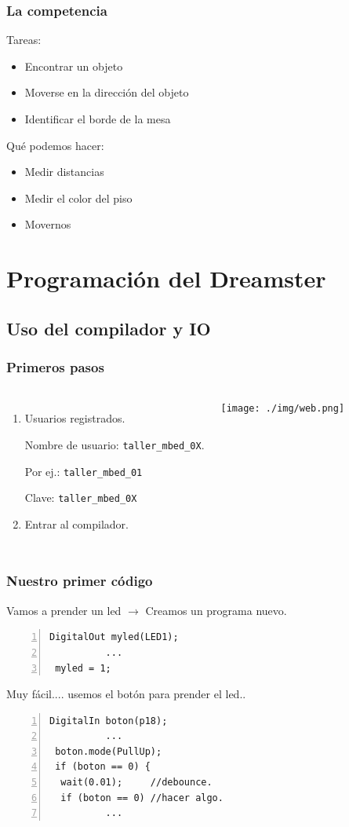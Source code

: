 \documentclass[compress]{beamer}
\begin{document}
\begin{frame}
 \frametitle{La competencia}
Tareas:
\begin{itemize}
 \item Encontrar un objeto
 \item Moverse en la dirección del objeto
 \item Identificar el borde de la mesa
\end{itemize}
Qué podemos hacer:
\begin{itemize}
 \item Medir distancias
 \item Medir el color del piso
 \item Movernos
\end{itemize}
 \end{frame}


\section{Programación del Dreamster}
\subsection{Uso del compilador y IO}

\begin{frame}[fragile]
 \frametitle{Primeros pasos}
\begin{columns}
\begin{enumerate}
 \item Usuarios registrados.

Nombre de usuario: \verb|taller_mbed_0X|.

Por ej.: \verb|taller_mbed_01|

Clave: \verb|taller_mbed_0X|
 \item Entrar al compilador.
\end{enumerate}
\begin{center}
 \texttt{[image: ./img/web.png]}
\end{center}
\end{columns}
\end{frame}

\begin{frame}[fragile]
 \frametitle{Nuestro primer código}
Vamos a prender un led $\rightarrow$ Creamos un programa nuevo.
\begin{Verbatim}[formatcom=\color{red},fontseries=b, numbers=left,numbersep=3pt]
 DigitalOut myled(LED1);
          ...
 myled = 1;
\end{Verbatim} 
Muy fácil.... usemos el botón para prender el led..
\begin{Verbatim}[formatcom=\color{red},fontseries=b, numbers=left,numbersep=3pt]
 DigitalIn boton(p18);
          ...
 boton.mode(PullUp);
 if (boton == 0) {
  wait(0.01);     //debounce.
  if (boton == 0) //hacer algo.
          ...
\end{Verbatim} 
\end{frame}
\end{document}

